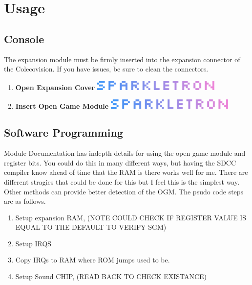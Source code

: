 \newpage

\section{Usage}

\subsection{Console}
\par
The expansion module must be firmly inserted into the expansion connector of the Colecovision. If you have issues, be sure
to clean the connectors.

\begin{enumerate}
  \item \textbf{Open Expansion Cover} \includegraphics[width=0.50\textwidth,keepaspectratio]{img/SPARKLETRON.png}
  \item \textbf{Insert Open Game Module} \includegraphics[width=0.50\textwidth,keepaspectratio]{img/SPARKLETRON.png}
\end{enumerate}

\subsection{Software Programming}
\par
Module Documentation has in\-depth details for using the open game module and register bits. You could do this in many different ways, but
having the SDCC compiler know ahead of time that the RAM is there works well for me. There are different stragies that could be done for this
but I feel this is the simplest way. Other methods can provide better detection of the OGM. The psudo code steps are as follows.

\begin{enumerate}
  \item Setup expansion RAM, (NOTE COULD CHECK IF REGISTER VALUE IS EQUAL TO THE DEFAULT TO VERIFY SGM)
  \item Setup IRQS
  \item Copy IRQs to RAM where ROM jumps used to be.
  \item Setup Sound CHIP, (READ BACK TO CHECK EXISTANCE)
\end{enumerate}

